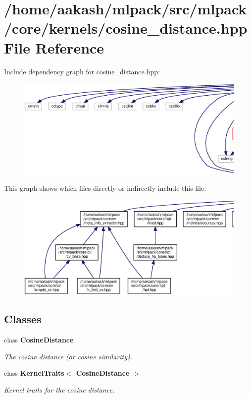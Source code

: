 \section{/home/aakash/mlpack/src/mlpack/core/kernels/cosine\+\_\+distance.hpp File Reference}
\label{cosine__distance_8hpp}
Include dependency graph for cosine\+\_\+distance.\+hpp\+:
\nopagebreak
\begin{figure}[H]
\begin{center}
\leavevmode
\includegraphics[width=350pt]{cosine__distance_8hpp__incl}
\end{center}
\end{figure}
This graph shows which files directly or indirectly include this file\+:
\nopagebreak
\begin{figure}[H]
\begin{center}
\leavevmode
\includegraphics[width=350pt]{cosine__distance_8hpp__dep__incl}
\end{center}
\end{figure}
\subsection*{Classes}
\begin{DoxyCompactItemize}
\item 
class \textbf{ Cosine\+Distance}
\begin{DoxyCompactList}\small\item\em The cosine distance (or cosine similarity). \end{DoxyCompactList}\item 
class \textbf{ Kernel\+Traits$<$ Cosine\+Distance $>$}
\begin{DoxyCompactList}\small\item\em Kernel traits for the cosine distance. \end{DoxyCompactList}\end{DoxyCompactItemize}
